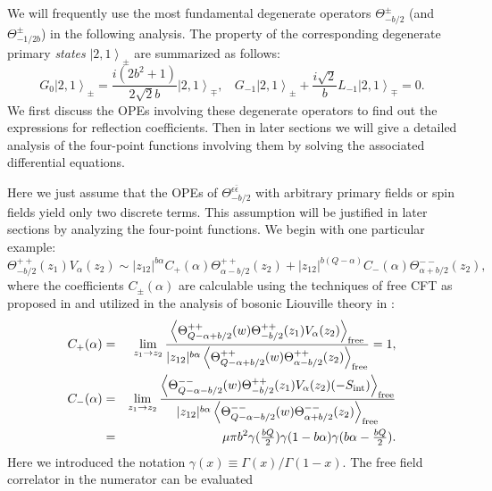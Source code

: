 \documentclass[a4paper,12pt]{article}
\newcommand{\vev}[1]{\left<{#1}\right>}
\newcommand{\ket}[1]{\left|{#1}\right>}
\newcommand{\tfrac}[2]{{\textstyle\frac{#1}{#2}}}
\newcommand{\ep}{{\epsilon}}
\newcommand{\bep}{{\bar{\epsilon}}}
\begin{document}
   We will frequently use the most fundamental degenerate operators
 $\Theta_{-b/2}^\pm$ (and $\Theta_{-1/2b}^\pm$)
 in the following analysis.
 The property of the corresponding degenerate primary
 {\it states} $\ket{2,1}_\pm$ are summarized as follows:
\begin{equation}
  G_0\ket{2,1}_\pm = \tfrac{i(2b^2+1)}{2\sqrt{2}b}\ket{2,1}_\mp,~~~~
  G_{-1}\ket{2,1}_\pm + \tfrac{i\sqrt{2}}{b}L_{-1}\ket{2,1}_\mp =0.
\end{equation}
 We first discuss the OPEs involving these degenerate operators
 to find out the expressions for reflection coefficients.
 Then in later sections we will give a detailed analysis of
 the four-point functions involving them by solving
 the associated differential equations.
  
   Here we just assume that the OPEs of $\Theta_{-b/2}^{\ep\bep}$
 with arbitrary primary fields or spin fields yield only two
 discrete terms.
 This assumption will be justified in later sections
 by analyzing the four-point functions.
 We begin with one particular example:
\begin{equation}
 \Theta_{-b/2}^{++}(z_1)V_\alpha(z_2)
 \sim |z_{12}|^{b\alpha}C_+(\alpha)\Theta_{\alpha-b/2}^{++}(z_2)
    + |z_{12}|^{b(Q-\alpha)}C_-(\alpha)\Theta_{\alpha+b/2}^{--}(z_2),
\end{equation}
 where the coefficients $C_\pm(\alpha)$ are calculable
 using the techniques of free CFT as proposed in \cite{T}
 and utilized in the analysis of bosonic Liouville theory
 in \cite{FZZ}:
\begin{eqnarray}
  C_+(\alpha) &=& \lim_{z_1\rightarrow z_2}
   \frac{\vev{\Theta_{Q-\alpha+b/2}^{++}(w)
              \Theta_{-b/2}^{++}(z_1)V_\alpha(z_2)}_{\rm free}}
        {|z_{12}|^{b\alpha}
         \vev{\Theta_{Q-\alpha+b/2}^{++}(w)
              \Theta_{\alpha-b/2}^{++}(z_2)}_{\rm free}} =1, \nonumber \\
  C_-(\alpha) &=& \lim_{z_1\rightarrow z_2}
   \frac{\vev{\Theta_{Q-\alpha-b/2}^{--}(w)
              \Theta_{-b/2}^{++}(z_1)
              V_\alpha(z_2)(-S_{\rm int})}_{\rm free}}
        {|z_{12}|^{b\alpha}
         \vev{\Theta_{Q-\alpha-b/2}^{--}(w)
              \Theta_{\alpha+b/2}^{--}(z_2)}_{\rm free}} \nonumber \\
  &=& \mu\pi b^2\gamma(\tfrac{bQ}{2})\gamma(1-b\alpha)
      \gamma(b\alpha-\tfrac{bQ}{2}).
\label{CNS}
\end{eqnarray}
 Here we introduced the notation $\gamma(x)\equiv \Gamma(x)/\Gamma(1-x)$.
 The free field correlator in the numerator can be evaluated
\end{document}
